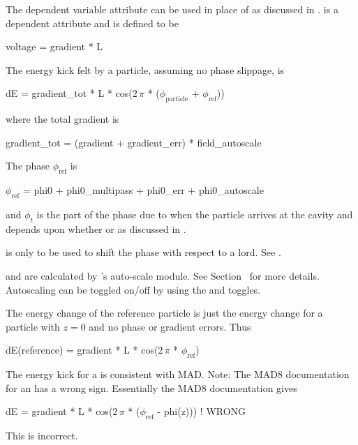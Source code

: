 The dependent variable  attribute can be used in place of
 as discussed in .   is a
dependent attribute and is defined to be
\begin{example}
  voltage = gradient * L
\end{example}

The energy kick felt by a particle, assuming no phase slippage, is 
\begin{example}
  dE = gradient_tot * L * cos(\(2\,\pi\) * (\(\phi_\text{particle}\) + \(\phi_\text{ref}\)))
\end{example}
where the total gradient is
\begin{example}
  gradient_tot = (gradient + gradient_err) * field_autoscale
\end{example}
The phase $\phi_{\text{ref}}$ is
\begin{example}
  \(\phi_{\text{ref}}\) = phi0 + phi0_multipass + phi0_err + phi0_autoscale
\end{example}
and $\phi_t$ is the part of the phase due to when the particle arrives
at the cavity and depends upon whether  or 
 as discussed in .

 is only to be used to shift the phase with respect to a
 lord. See .

 and  are calculated by \bmad's auto-scale
module. See Section~ for more details. Autoscaling can be toggled on/off
by using the  and  toggles.

The energy change of the reference particle is just the energy change for a 
particle with $z = 0$ and no phase or gradient errors. Thus
\begin{example}
  dE(reference) = gradient * L * cos(\(2\,\pi\) * \(\phi_{\text{ref}}\))
\end{example}

The energy kick for a \bmad {} is consistent with MAD. 
Note: The MAD8 documentation for an  has a wrong
sign. Essentially the MAD8 documentation gives
\begin{example}
  dE = gradient * L * cos(\(2\,\pi\) * (\(\phi_{\text{ref}}\) - phi(z))) ! WRONG
\end{example}
This is incorrect. 

